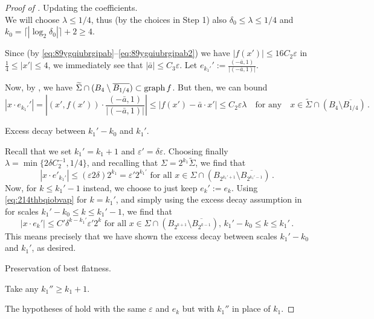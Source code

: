 \documentclass{article}
\newcommand{\ep}{\varepsilon}
\theoremstyle{definition}
\begin{document}
\begin{proof}[Proof of ]
 Updating the coefficients.\\
We will choose $\lambda\leq 1/4$, thus (by the choices in Step 1) also $\delta_0\leq \lambda\leq 1/4$ and $k_0=\lceil|\log_2 \delta_0|\rceil+2\geq 4$.

 Since (by \eqref{eq:89ygqiubrgipab}--\eqref{eq:89ygqiubrgipab2}) we have $|f(x')|\leq 16C_2\ep$ in $\frac{1}{4}\leq |x'|\leq 4$, we immediately see that $|\bar a|\leq C_3\ep$. Let $e_{k_1'}':=\frac{(-\bar a,1)}{|(-\bar a,1)|}$.

Now, by , we have $\widetilde \Sigma \cap (B_{4}\setminus \overline{B_{1/4}})\subset {\rm graph}\, f$. But then, we can bound
\begin{equation}\label{eq:8t1oibwg6d}
    |x\cdot e_{k_1'}'|=|(x',f(x'))\cdot\frac{(-\bar a,1)}{|(-\bar a,1)|}|\leq |f(x')-\bar a\cdot x'|\leq  C_2\ep\lambda\quad\mbox{for any}\quad x\in \widetilde \Sigma \cap (B_{4}\setminus \overline{B_{1/4}})\,.
\end{equation}

 Excess decay between $k_1'-k_0$ and $k_1'$.

Recall that we set $k_1'=k_1+1$ and $\ep'=\delta \ep$. Choosing finally $\lambda=\min\{2\delta C_2^{-1},1/4\}$, and recalling that $\Sigma=2^{k_1}\widetilde \Sigma$, we find that
\begin{equation}\label{eq:214thbqiobvap}
    |x\cdot e'_{k_1'}|\leq (\ep 2\delta) 2^{k_1}=\ep'2^{k_1'} \mbox{ for all } x\in\Sigma\cap(B_{2^{k_1'+1}}\setminus \overline{B_{2^{k_1'-1}}})\,.
\end{equation}
Now, for $k\leq k_1'-1$ instead, we choose to just keep $e_k':=e_k$. Using \eqref{eq:214thbqiobvap} for $k=k_1'$, and simply using the excess decay assumption in  for scales $k_1'-k_0\leq k\leq k_1'-1$, we find that
$$|x\cdot e_{k}'|\leq C'\delta^{k-k_1'}\ep'2^{k} \mbox{ for all } x\in\Sigma\cap(B_{2^{k+1}}\setminus \overline{B_{2^{k-1}}}),\, k_1'-k_0\leq k \leq k_1'\,.$$
This means precisely that we have shown the excess decay between scales $k_1'-k_0$ and $k_1'$, as desired.

 Preservation of best flatness.

Take any $k_1''\geq k_1+1$.

 The hypotheses of  hold with the same $\ep$ and $e_k$ but with $k_1''$ in place of $k_1$.


\end{proof}
\end{document}
